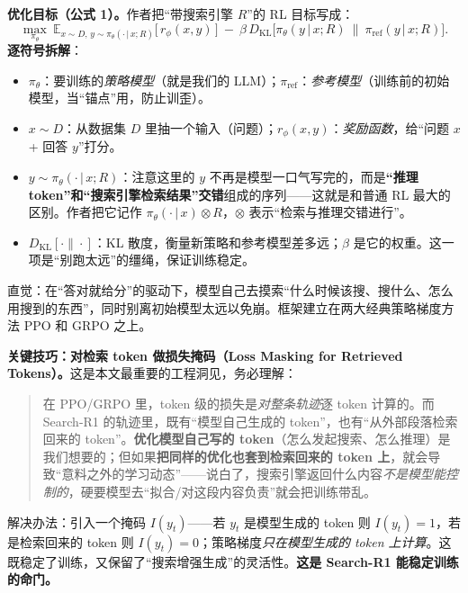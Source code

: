 \documentclass[11pt,UTF8,fontset=fandol]{ctexart}
\begin{document}
\textbf{优化目标（公式 1）。}\quad 作者把“带搜索引擎 $R$”的 RL 目标写成：
\begin{equation*}
\max_{\pi_\theta}\ \mathbb{E}_{x\sim D,\, y\sim \pi_\theta(\cdot\,|\,x;R)}\big[\, r_\phi(x,y)\,\big]\ -\ \beta\, D_{\mathrm{KL}}\!\big[\pi_\theta(y\,|\,x;R)\ \|\ \pi_{\mathrm{ref}}(y\,|\,x;R)\big].
\tag{1}
\end{equation*}
\textbf{逐符号拆解}：
\begin{itemize}[leftmargin=1.4em]
\item $\pi_\theta$：要训练的\emph{策略模型}（就是我们的 LLM）；$\pi_{\mathrm{ref}}$：\emph{参考模型}（训练前的初始模型，当“锚点”用，防止训歪）。
\item $x\sim D$：从数据集 $D$ 里抽一个输入（问题）；$r_\phi(x,y)$：\emph{奖励函数}，给“问题 $x$ + 回答 $y$”打分。
\item $y\sim \pi_\theta(\cdot\,|\,x;R)$：注意这里的 $y$ 不再是模型一口气写完的，而是\textbf{“推理 token”和“搜索引擎检索结果”交错}组成的序列——这就是和普通 RL 最大的区别。作者把它记作 $\pi_\theta(\cdot\,|\,x)\otimes R$，$\otimes$ 表示“检索与推理交错进行”。
\item $D_{\mathrm{KL}}[\cdot\|\cdot]$：KL 散度，衡量新策略和参考模型差多远；$\beta$ 是它的权重。这一项是“别跑太远”的缰绳，保证训练稳定。
\end{itemize}
直觉：在“答对就给分”的驱动下，模型自己去摸索“什么时候该搜、搜什么、怎么用搜到的东西”，同时别离初始模型太远以免崩。框架建立在两大经典策略梯度方法 PPO 和 GRPO 之上。

\textbf{关键技巧：对检索 token 做损失掩码（Loss Masking for Retrieved Tokens）。}\quad 这是本文最重要的工程洞见，务必理解：
\begin{quote}\small
在 PPO/GRPO 里，token 级的损失是\emph{对整条轨迹}逐 token 计算的。而 Search-R1 的轨迹里，既有“模型自己生成的 token”，也有“从外部段落检索回来的 token”。\textbf{优化模型自己写的 token}（怎么发起搜索、怎么推理）是我们想要的；但如果\textbf{把同样的优化也套到检索回来的 token 上}，就会导致“意料之外的学习动态”——说白了，搜索引擎返回什么内容\emph{不是模型能控制的}，硬要模型去“拟合/对这段内容负责”就会把训练带乱。
\end{quote}
解决办法：引入一个掩码 $I(y_t)$——若 $y_t$ 是模型生成的 token 则 $I(y_t)=1$，若是检索回来的 token 则 $I(y_t)=0$；策略梯度\emph{只在模型生成的 token 上计算}。这既稳定了训练，又保留了“搜索增强生成”的灵活性。\textbf{这是 Search-R1 能稳定训练的命门。}
\end{document}
